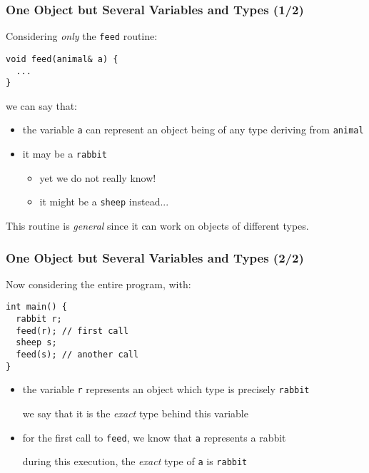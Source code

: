 \documentclass{beamer}
\newcommand{\code}[1]{{\scriptsize{\texttt{#1}}}\xspace}
\begin{document}
\begin{frame}[fragile]
  \frametitle{One Object but Several Variables and Types (1/2)}

Considering \emph{only} the \code{feed} routine:
\begin{lstlisting}
void feed(animal& a) {
  ...
}
\end{lstlisting}

\smallskip

we can say that:
\begin{itemize}
\item the variable \code{a} can represent an object being of any type
  deriving from \code{animal}
\item it may be a \code{rabbit}
  \begin{itemize}
  \item yet we do not really know!
  \item it might be a \code{sheep} instead...
  \end{itemize}
\end{itemize}

\smallskip

\begin{center}
  This routine is \emph{general} since it can work on objects of
  different types.
\end{center}

\end{frame}



\begin{frame}[fragile]
  \frametitle{One Object but Several Variables and Types (2/2)}

Now considering the entire program, with:
\begin{lstlisting}
int main() {
  rabbit r;
  feed(r); // first call
  sheep s;
  feed(s); // another call
}
\end{lstlisting}

\begin{itemize}
\item the variable \code{r} represents an object which type is
  precisely \code{rabbit}
  \begin{center}
    we say that it is the \emph{exact} type behind this variable
  \end{center}
\item for the first call to \code{feed}, we know that \code{a} represents a rabbit
  \begin{center}
    during this execution, the \emph{exact} type of \code{a} is \code{rabbit}
  \end{center}
\end{itemize}

\end{frame}
\end{document}
